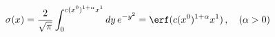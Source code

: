 \begin{equation}
 \sigma(x)=\frac{2}{\sqrt{\pi}} \int_0^{c(x^0)^{1+\alpha} x^1}
    dy\,e^{-y^2} = \erf (c(x^0)^{1+\alpha} x^1)\,,
   \quad(\alpha>0) \label{signf}
\end{equation}

